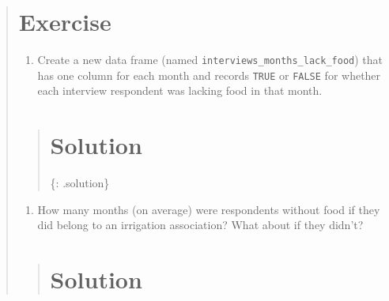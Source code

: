 \documentclass[]{book}
\newenvironment{Shaded}{\begin{snugshade}}{\end{snugshade}}
\newcommand{\KeywordTok}[1]{\textcolor[rgb]{0.13,0.29,0.53}{\textbf{#1}}}
\newcommand{\DataTypeTok}[1]{\textcolor[rgb]{0.13,0.29,0.53}{#1}}
\newcommand{\StringTok}[1]{\textcolor[rgb]{0.31,0.60,0.02}{#1}}
\newcommand{\OtherTok}[1]{\textcolor[rgb]{0.56,0.35,0.01}{#1}}
\newcommand{\OperatorTok}[1]{\textcolor[rgb]{0.81,0.36,0.00}{\textbf{#1}}}
\newcommand{\NormalTok}[1]{#1}
\providecommand{\tightlist}{%
  \setlength{\itemsep}{0pt}\setlength{\parskip}{0pt}}
\begin{document}
\begin{quote}
\section{Exercise}\label{exercise-11}

\begin{enumerate}
\def\labelenumi{\arabic{enumi}.}
\tightlist
\item
  Create a new data frame (named
  \texttt{interviews\_months\_lack\_food}) that has one column for each
  month and records \texttt{TRUE} or \texttt{FALSE} for whether each
  interview respondent was lacking food in that month.
\end{enumerate}

\begin{quote}
\section{Solution}\label{solution-14}

\begin{Shaded}
\end{Shaded}

\{: .solution\}
\end{quote}

\begin{enumerate}
\def\labelenumi{\arabic{enumi}.}
\setcounter{enumi}{1}
\tightlist
\item
  How many months (on average) were respondents without food if they did
  belong to an irrigation association? What about if they didn't?
\end{enumerate}

\begin{quote}
\section{Solution}\label{solution-15}


\end{quote}
\end{quote}
\end{document}

